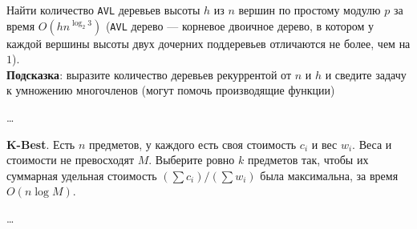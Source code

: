 \begin{problem}
    Найти количество \texttt{AVL} деревьев высоты $h$ из $n$ вершин по простому модулю $p$ за время $O(h n^{\log_2 3})$
    (\texttt{AVL} дерево --- корневое двоичное дерево, в котором у каждой вершины высоты двух дочерних поддеревьев отличаются не более, чем на $1$).\\
    {
        \footnotesize \textbf{Подсказка}: выразите количество деревьев рекуррентой от $n$ и $h$ и сведите задачу к умножению многочленов
        (могут помочь производящие функции)
    }
\end{problem}

\begin{solution}
    \dots
\end{solution}


\begin{problem}
    \textbf{K-Best}. Есть $n$ предметов, у каждого есть своя стоимость $c_i$ и вес $w_i$. Веса и стоимости не превосходят $M$.
    Выберите ровно $k$ предметов так, чтобы их суммарная удельная стоимость $\left(\sum c_i\right) / \left(\sum w_i\right)$ была максимальна,
    за время $O(n \log M)$.
\end{problem}


\begin{solution}
    \dots
\end{solution}


\clearpage
